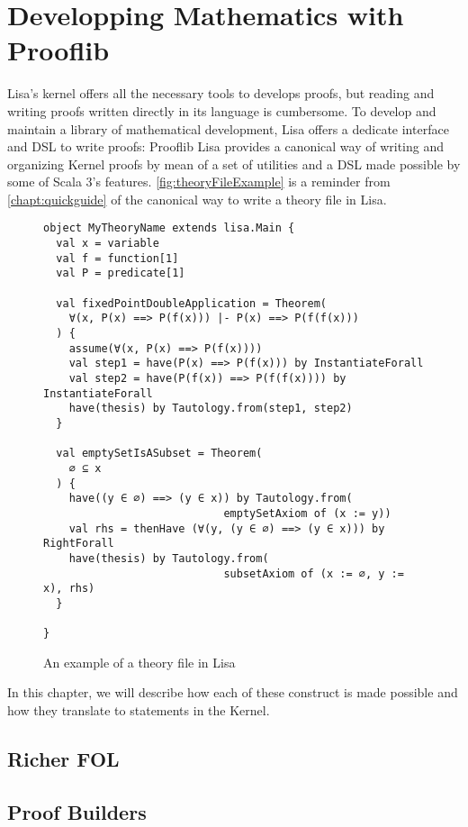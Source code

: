 \chapter{Developping Mathematics with Prooflib}
\label{chapt:prooflib}
Lisa's kernel offers all the necessary tools to develops proofs, but  reading and writing proofs written directly in its language is cumbersome. 
To develop and maintain a library of mathematical development, Lisa offers a dedicate interface and DSL to write proofs: Prooflib
Lisa provides a canonical way of writing and organizing Kernel proofs by mean of a set of utilities and a DSL made possible by some of Scala 3's features.
\autoref{fig:theoryFileExample} is a reminder from \autoref{chapt:quickguide} of the canonical way to write a theory file in Lisa.

\begin{figure}
\begin{lstlisting}[language=lisa, frame=single]
object MyTheoryName extends lisa.Main {
  val x = variable
  val f = function[1]
  val P = predicate[1]

  val fixedPointDoubleApplication = Theorem( 
    ∀(x, P(x) ==> P(f(x))) |- P(x) ==> P(f(f(x)))
  ) {
    assume(∀(x, P(x) ==> P(f(x))))
    val step1 = have(P(x) ==> P(f(x))) by InstantiateForall
    val step2 = have(P(f(x)) ==> P(f(f(x)))) by InstantiateForall
    have(thesis) by Tautology.from(step1, step2)
  } 

  val emptySetIsASubset = Theorem(
    ∅ ⊆ x
  ) {
    have((y ∈ ∅) ==> (y ∈ x)) by Tautology.from(
                            emptySetAxiom of (x := y))
    val rhs = thenHave (∀(y, (y ∈ ∅) ==> (y ∈ x))) by RightForall
    have(thesis) by Tautology.from(
                            subsetAxiom of (x := ∅, y := x), rhs)
  }

}
\end{lstlisting}
\caption{An example of a theory file in Lisa}
\label{fig:theoryFileExample}
\end{figure}

In this chapter, we will describe how each of these construct is made possible and how they translate to statements in the Kernel.

\section{Richer FOL}



\section{Proof Builders}

